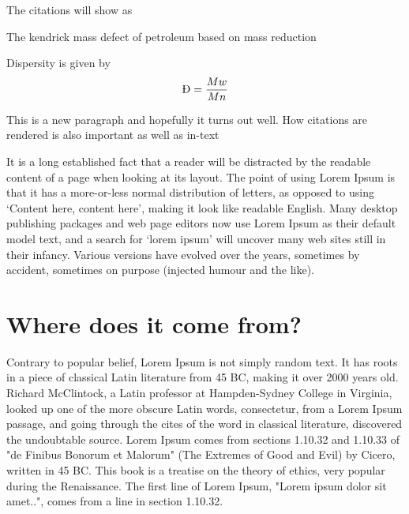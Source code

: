  
  The citations will show as~\cite{aseyevNonionicThermoresponsivePolymers2010,yinDualThermoPHResponsive2023,yinCO2switchableThermoresponsivenessPolyNNdiethylaminoethyl2023}
 
 The kendrick mass defect of petroleum based on mass reduction~\cite{kendrickMassScaleBased1963}
  
  Dispersity is given by 
 \begin{align}
 	 \text{\DJ}=\frac{Mw}{Mn} 
 \end{align}

\noindent This is a new paragraph and hopefully it turns out well. How citations are rendered is also important  as well as in-text 



It is a long established fact that a reader will be distracted by the readable content of a page when looking at its layout. The point of using Lorem Ipsum is that it has a more-or-less normal distribution of letters, as opposed to using `Content here, content here', making it look like readable English. Many desktop publishing packages and web page editors now use Lorem Ipsum as their default model text, and a search for `lorem ipsum' will uncover many web sites still in their infancy. Various versions have evolved over the years, sometimes by accident, sometimes on purpose (injected humour and the like).

\section{Where does it come from?}  %
\label{section1.3}

Contrary to popular belief, Lorem Ipsum is not simply random text. It has roots in a piece of classical Latin literature from 45 BC, making it over 2000 years old. Richard McClintock, a Latin professor at Hampden-Sydney College in Virginia, looked up one of the more obscure Latin words, consectetur, from a Lorem Ipsum passage, and going through the cites of the word in classical literature, discovered the undoubtable source. Lorem Ipsum comes from sections 1.10.32 and 1.10.33 of "de Finibus Bonorum et Malorum" (The Extremes of Good and Evil) by Cicero, written in 45 BC. This book is a treatise on the theory of ethics, very popular during the Renaissance. The first line of Lorem Ipsum, "Lorem ipsum dolor sit amet..", comes from a line in section 1.10.32.

